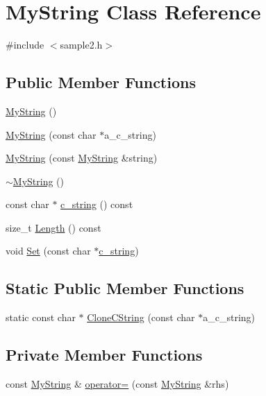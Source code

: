 \hypertarget{classMyString}{}\section{My\+String Class Reference}
\label{classMyString}


{\ttfamily \#include $<$sample2.\+h$>$}

\subsection*{Public Member Functions}
\begin{DoxyCompactItemize}
\item 
\hyperlink{classMyString_a1cb17852b83614394b59720779c5f918}{My\+String} ()
\item 
\hyperlink{classMyString_a28134eb91b6698f46b12accefa157d0f}{My\+String} (const char $\ast$a\+\_\+c\+\_\+string)
\item 
\hyperlink{classMyString_ae24c7cf89a58dd2287303df2ac054c66}{My\+String} (const \hyperlink{classMyString}{My\+String} \&string)
\item 
\hyperlink{classMyString_a7bee4fe8ad82a0b7b8f65b02054b156b}{$\sim$\+My\+String} ()
\item 
const char $\ast$ \hyperlink{classMyString_aff2af0cf30db39fe24a235670ee6ff25}{c\+\_\+string} () const
\item 
size\+\_\+t \hyperlink{classMyString_a4eb168b1ec401a732b3859abe004d648}{Length} () const
\item 
void \hyperlink{classMyString_a521c4cd7eccac6ce554d8a51505e4970}{Set} (const char $\ast$\hyperlink{classMyString_aff2af0cf30db39fe24a235670ee6ff25}{c\+\_\+string})
\end{DoxyCompactItemize}
\subsection*{Static Public Member Functions}
\begin{DoxyCompactItemize}
\item 
static const char $\ast$ \hyperlink{classMyString_a3acde3db40f8e70bad239739a5466275}{Clone\+C\+String} (const char $\ast$a\+\_\+c\+\_\+string)
\end{DoxyCompactItemize}
\subsection*{Private Member Functions}
\begin{DoxyCompactItemize}
\item 
const \hyperlink{classMyString}{My\+String} \& \hyperlink{classMyString_a0156d24764b9d8e4303763750f95cd38}{operator=} (const \hyperlink{classMyString}{My\+String} \&rhs)
\end{DoxyCompactItemize}
